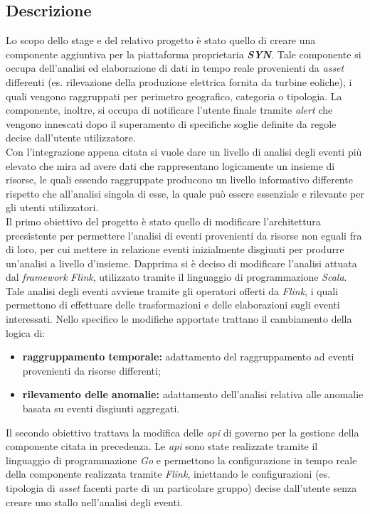 \subsection{Descrizione}

Lo scopo dello stage e del relativo progetto è stato quello di creare una componente aggiuntiva per la piattaforma proprietaria \textbf{\textit{SYN}}. Tale componente si occupa dell'analisi ed elaborazione di dati in tempo reale provenienti da \textit{asset} differenti (es. rilevazione della produzione elettrica fornita da turbine eoliche), i quali vengono raggruppati per perimetro geografico, categoria o tipologia. La componente, inoltre,
si occupa di notificare l'utente finale tramite \textit{alert} che vengono innescati dopo il superamento di specifiche soglie definite da regole decise dall'utente utilizzatore.\\
Con l'integrazione appena citata si vuole dare un livello di analisi degli eventi più elevato che mira ad avere dati che rappresentano logicamente un insieme di risorse, le quali essendo raggruppate producono un livello informativo differente rispetto che all'analisi singola di esse, la quale può essere essenziale e rilevante per gli utenti utilizzatori.\\
Il primo obiettivo del progetto è stato quello di modificare l'architettura preesistente per permettere l'analisi di eventi provenienti da risorse non eguali fra di loro, per cui mettere in relazione eventi inizialmente disgiunti per produrre un'analisi a livello d'insieme. Dapprima si è deciso di modificare l'analisi attuata dal \textit{\gls{framework}} \textit{Flink}, utilizzato tramite il linguaggio di programmazione \textit{Scala}. Tale analisi degli eventi avviene tramite gli operatori offerti da \textit{Flink}, i quali permettono di effettuare delle trasformazioni e delle elaborazioni sugli eventi interessati. Nello specifico le modifiche apportate trattano il cambiamento della logica di:
\begin{itemize}
	\item{\textbf{raggruppamento temporale:} adattamento del raggruppamento ad eventi provenienti da risorse differenti;}
	\item{\textbf{rilevamento delle anomalie:} adattamento dell'analisi relativa alle anomalie basata su eventi disgiunti aggregati.}
\end{itemize}
Il secondo obiettivo trattava la modifica delle \textit{\gls{api}} di governo per la gestione della componente citata in precedenza. Le \textit{\gls{api}} sono state realizzate tramite il linguaggio di programmazione \textit{Go} e permettono la configurazione in tempo reale della componente realizzata tramite \textit{Flink}, iniettando le configurazioni (es. tipologia di \textit{asset} facenti parte di un particolare gruppo) decise dall'utente senza creare uno stallo nell'analisi degli eventi.

